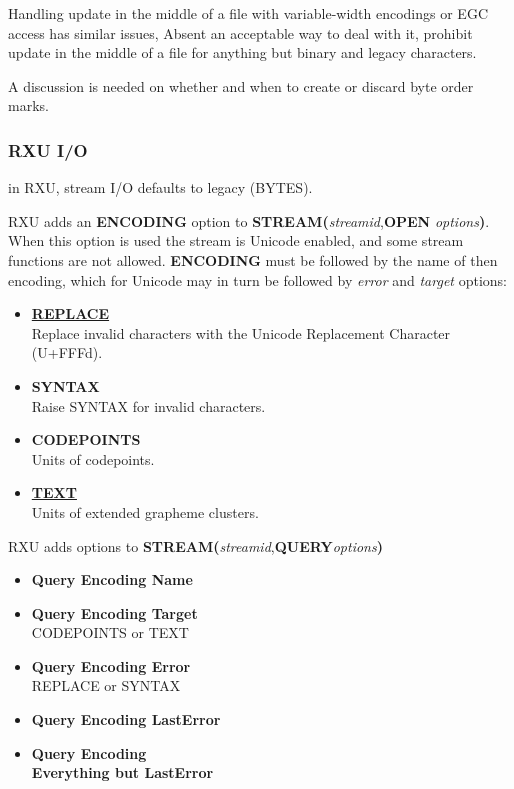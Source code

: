 \documentclass[b4paper]{article}
\begin{document}
Handling update in the middle of a file with variable-width encodings
or EGC access has similar issues, Absent an acceptable way to deal
with it, prohibit update in the middle of a file for anything but
binary and legacy characters.

A discussion is needed on whether and when to create or discard byte order marks.

\subsubsection{RXU I/O}

in RXU, stream I/O\cite{RXU:STREAM} defaults to legacy (BYTES).

RXU adds an \textbf{ENCODING} option to \textbf{STREAM(}\textit{streamid},\textbf{OPEN }\textit{options}\textbf{)}. When this option is used the stream is Unicode enabled, and some stream functions are not allowed.
\textbf{ENCODING} must be followed by the name of then encoding, which for Unicode may in turn be followed by \textit{error} and \textit{target} options:

\begin{itemize}
  \item \underline{\textbf{REPLACE}} \\
  Replace invalid characters with the Unicode Replacement Character (U+FFFd).
  \item \textbf{SYNTAX} \\
  Raise SYNTAX for invalid characters.
  \item \textbf{CODEPOINTS} \\
  Units of codepoints.
  \item \underline{\textbf{TEXT}} \\
  Units of extended grapheme clusters.
\end{itemize}
 
RXU adds  options to  \textbf{STREAM(}\textit{streamid},\textbf{QUERY}\textit{options}\textbf{)}

\begin{itemize}
\item \textbf{Query Encoding Name}
\item \textbf{Query Encoding Target} \\
CODEPOINTS  or TEXT
\item \textbf{Query Encoding Error} \\
REPLACE or SYNTAX
\item \textbf{Query Encoding LastError}
\item \textbf{Query Encoding \\
Everything but LastError}
\end{itemize}
\end{document}
